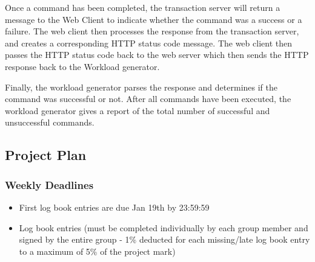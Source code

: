 \documentclass[a4paper,10pt]{article}
\begin{document}
Once a command has been completed, the transaction server will return a message 
to the Web Client to indicate whether the command was a success or a failure. 
The web client then processes the response from the transaction server, and 
creates a corresponding HTTP status code message. The web client then passes the 
HTTP status code back to the web server which then sends the HTTP response back 
to the Workload generator. 

Finally, the workload generator parses the response and determines if the 
command was successful or not. After all commands have been executed, the 
workload generator gives a report of the total number of successful and 
unsuccessful commands.

\subsection{Project Plan}

\subsubsection{Weekly Deadlines}
\begin{itemize}
\item First log book entries are due Jan 19th by 23:59:59
\item Log book entries (must be completed individually by each group member and 
signed by the entire group - 1\% deducted for each missing/late log book entry 
to a maximum of 5\% of the project mark)
\end{itemize}
\end{document}
